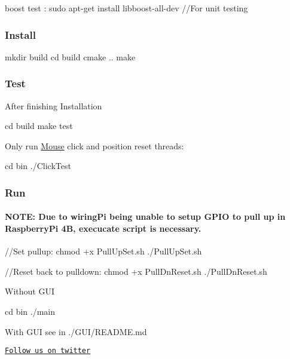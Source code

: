 \begin{DoxyCode}
boost test : sudo apt-get install libboost-all-dev 
//For unit testing
\end{DoxyCode}


\subsubsection*{Install}


\begin{DoxyCode}
mkdir build
cd build
cmake ..  
make
\end{DoxyCode}


\subsubsection*{Test}

After finishing Installation 
\begin{DoxyCode}
cd build  
make test
\end{DoxyCode}
 Only run \hyperlink{classMouse}{Mouse} click and position reset threads\+: 
\begin{DoxyCode}
cd bin
./ClickTest
\end{DoxyCode}


\subsubsection*{Run}

\paragraph*{N\+O\+TE\+: Due to wiring\+Pi being unable to setup G\+P\+IO to pull up in Raspberry\+Pi 4B, execucate script is necessary.}


\begin{DoxyCode}
//Set pullup:
chmod +x PullUpSet.sh
./PullUpSet.sh

//Reset back to pulldown:
chmod +x PullDnReset.sh
./PullDnReset.sh
\end{DoxyCode}
 Without G\+UI 
\begin{DoxyCode}
cd bin  
./main
\end{DoxyCode}
 With G\+UI see in ./\+G\+U\+I/\+R\+E\+A\+D\+ME.md

\href{https://twitter.com/glove_mouse}{\tt Follow us on twitter} 